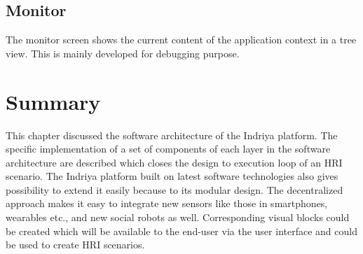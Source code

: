\subsection*{Monitor}
The monitor screen shows the current content of the application context in a tree view. This is mainly developed for debugging purpose.

\section{Summary}
This chapter discussed the software architecture of the Indriya platform. The specific implementation of a set of components of each layer in the software architecture are described which closes the design to execution loop of an HRI scenario. The Indriya platform built on latest software technologies also gives possibility to extend it easily because to its modular design. The decentralized approach makes it easy to integrate new sensors like those in smartphones, wearables etc., and new social robots as well. Corresponding visual blocks could be created which will be available to the end-user via the user interface and could be used to create HRI scenarios.
